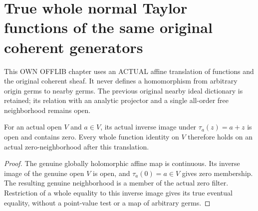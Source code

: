 \section{True whole normal Taylor functions of the same original coherent generators}
This OWN OFFLIB chapter uses an ACTUAL affine translation of functions and
the original coherent sheaf. It never defines a homomorphism from arbitrary
origin germs to nearby germs. The previous original nearby ideal dictionary
is retained; its relation with an analytic projector and a single all-order
free neighborhood remains open.

\begin{lemma}
\label{hir:relative-normal-translated-taylor-actual-source-open}
\leanok
{}
For an actual open $V$ and $a\in V$, its actual inverse image under
$\tau_a(z)=a+z$ is open and contains zero. Every whole function identity on
$V$ therefore holds on an actual zero-neighborhood after this translation.
\end{lemma}
\begin{proof}
The genuine globally holomorphic affine map is continuous. Its inverse image
of the genuine open $V$ is open, and $\tau_a(0)=a\in V$ gives zero membership.
The resulting genuine neighborhood is a member of the actual zero filter.
Restriction of a whole equality to this inverse image gives its true
eventual equality, without a point-value test or a map of arbitrary germs.
\end{proof}

